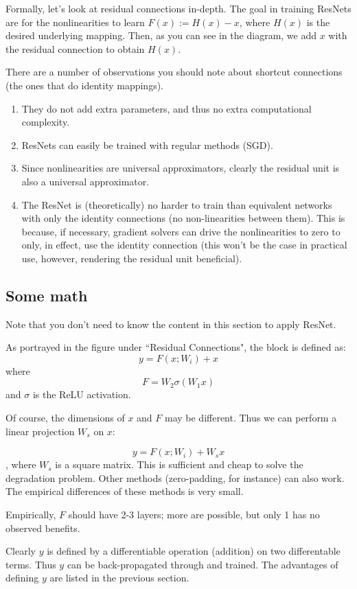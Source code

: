 \documentclass{article}
\begin{document}
Formally, let's look at residual connections in-depth.
The goal in training ResNets are for the nonlinearities to learn $F(x) := H(x) - x$, where $H(x)$ is the desired underlying mapping. Then, as you can see in the diagram,  we add $x$ with the residual connection to obtain $H(x)$.

There are a number of observations you should note about shortcut connections (the ones that do identity mappings).
\begin{enumerate}
    \item They do not add extra parameters, and thus no extra computational complexity.
    \item ResNets can easily be trained with regular methods (SGD).
    \item Since nonlinearities are universal approximators, clearly the residual unit is also a universal approximator.
    \item The ResNet is (theoretically) no harder to train than equivalent networks with only the identity connections (no non-linearities between them). This is because, if necessary, gradient solvers can drive the nonlinearities to zero to only, in effect, use the identity connection (this won't be the case in practical use, however, rendering the residual unit beneficial).
\end{enumerate}

\subsection{Some math}
Note that you don't need to know the content in this section to apply ResNet.

As portrayed in the figure under ``Residual Connections", the block is defined as:
$$ y = F(x; W_i) + x$$
where
$$ F = W_2 \sigma(W_1 x) $$
and $\sigma$ is the ReLU activation.

Of course, the dimensions of $x$ and $F$ may be different. Thus we can perform a linear projection $W_s$ on $x$:

$$ y = F(x; W_i) + W_s x$$, where $W_s$ is a square matrix. This is sufficient and cheap to solve the degradation problem. Other methods (zero-padding, for instance) can also work. The empirical differences of these methods is very small.

Empirically, $F$ should have 2-3 layers; more are possible, but only 1 has no observed benefits.

Clearly $y$ is defined by a differentiable operation (addition) on two differentable terms. Thus $y$ can be back-propagated through and trained. The advantages of defining $y$ are listed in the previous section.
\end{document}
